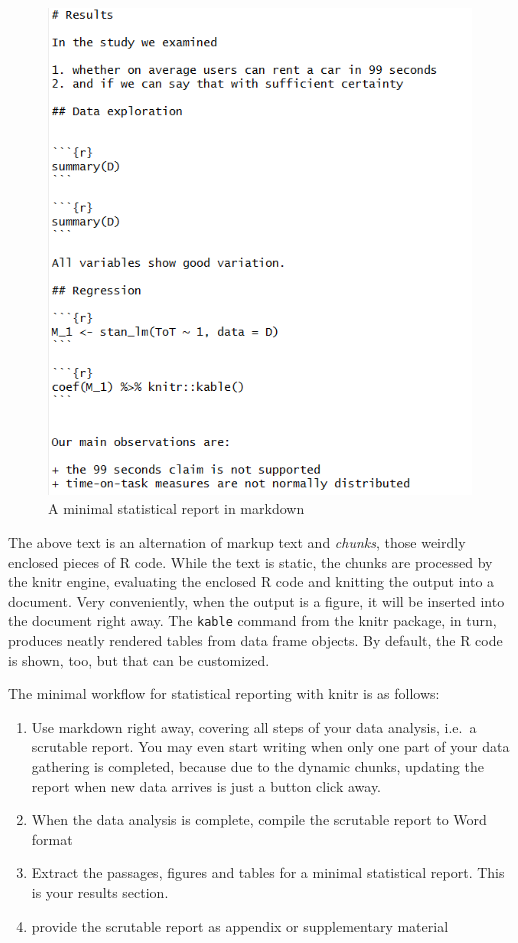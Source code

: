 \documentclass[]{svmono}
\providecommand{\tightlist}{%
  \setlength{\itemsep}{0pt}\setlength{\parskip}{0pt}}
\theoremstyle{definition}
\theoremstyle{definition}
\theoremstyle{definition}
\theoremstyle{remark}
\begin{document}
\begin{figure}
\centering
\includegraphics{Illustrations/markup_minimal_report.png}
\caption{A minimal statistical report in markdown}
\end{figure}

The above text is an alternation of markup text and \emph{chunks}, those
weirdly enclosed pieces of R code. While the text is static, the chunks
are processed by the knitr engine, evaluating the enclosed R code and
knitting the output into a document. Very conveniently, when the output
is a figure, it will be inserted into the document right away. The
\texttt{kable} command from the knitr package, in turn, produces neatly
rendered tables from data frame objects. By default, the R code is
shown, too, but that can be customized.

The minimal workflow for statistical reporting with knitr is as follows:

\begin{enumerate}
\def\labelenumi{\arabic{enumi}.}
\tightlist
\item
  Use markdown right away, covering all steps of your data analysis,
  i.e.~a scrutable report. You may even start writing when only one part
  of your data gathering is completed, because due to the dynamic
  chunks, updating the report when new data arrives is just a button
  click away.
\item
  When the data analysis is complete, compile the scrutable report to
  Word format
\item
  Extract the passages, figures and tables for a minimal statistical
  report. This is your results section.
\item
  provide the scrutable report as appendix or supplementary material
\end{enumerate}
\end{document}
